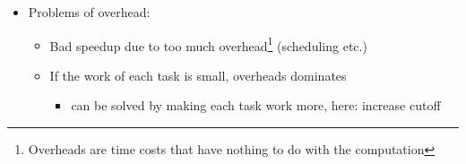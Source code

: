 \documentclass[a4paper]{article}
\newcommand{\inline}[1]{\lstinline!#1!}%
\begin{document}
\begin{itemize}
\begin{itemize}
\item \inline{.fork()}: creates a new task
\item \inline{.join()}: returns the result when task is done
\item \inline{.invoke()}: executes task without spawning a new task (in-place)
\item subclasses need to define \inline{compute()}
\end{itemize}
Note \inline{fork()}, \inline{join()}, \inline{join()} don't work (well) in Java, solved by using\footnote{``+'' is in this case the arithmetic addition but can also be something else of a combining nature}
\begin{lstlisting}
t1.fork(), r2 = t2.compute()
return r2 + t1.join()
\end{lstlisting}
\item Problems of overhead: 
\begin{itemize}
\item Bad speedup due to too much overhead\footnote{Overheads are time costs that have nothing to do with the computation} (scheduling etc.)
\item If the work of each task is small, overheads dominates
\begin{itemize}
\item can be solved by making each task work more, here: increase cutoff
\end{itemize}
\end{itemize}
\end{itemize}
\end{document}
